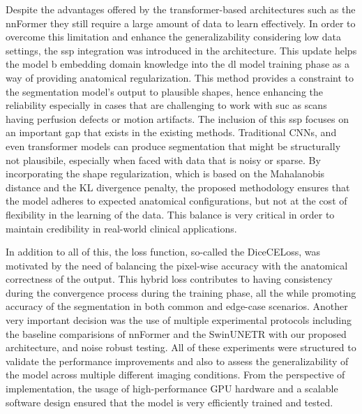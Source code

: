 Despite the advantages offered by the transformer-based architectures such as the nnFormer they still require a large amount of data to learn effectively. In order to overcome this limitation and enhance the generalizability considering low data settings, the \gls{ssp} integration was introduced in the architecture. This update helps the model b embedding domain knowledge into the \gls{dl} model training phase as a way of providing anatomical regularization. This method provides a constraint to the segmentation model's output to plausible shapes, hence enhancing the reliability especially in cases that are challenging to work with suc as scans having perfusion defects or motion artifacts. The inclusion of this \gls{ssp} focuses on an important gap that exists in the existing methods. Traditional CNNs, and even transformer models can produce segmentation that might be structurally not plausibile, especially when faced with data that is noisy or sparse. By incorporating the shape regularization, which is based on the Mahalanobis distance and the KL divergence penalty, the proposed methodology ensures that the model adheres to expected anatomical configurations, but not at the cost of flexibility in the learning of the data. This balance is very critical in order to maintain credibility in real-world clinical applications.

In addition to all of this, the loss function, so-called the DiceCELoss, was motivated by the need of balancing the pixel-wise accuracy with the anatomical correctness of the output. This hybrid loss contributes to having consistency during the convergence process during the training phase, all the while promoting accuracy of the segmentation in both common and edge-case scenarios. Another very important decision was the use of multiple experimental protocols including the baseline comparisions of nnFormer and the SwinUNETR with our proposed architecture, and noise robust testing. All of these experiments were structured to validate the performance improvements and also to assess the generalizability of the model across multiple different imaging conditions. From the perspective of implementation, the usage of high-performance GPU hardware and a scalable software design ensured that the model is very efficiently trained and tested.

